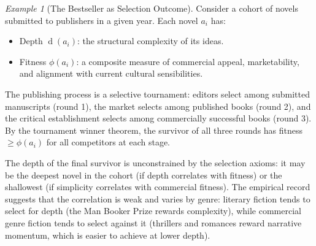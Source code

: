\documentclass[11pt,openany]{book}
\theoremstyle{definition}
\theoremstyle{plain}
\theoremstyle{remark}
\newtheorem{example}[axiom]{Example}
\newcommand{\depth}{\operatorname{d}}       %
\begin{document}
\begin{example}[The Bestseller as Selection Outcome]
Consider a cohort of novels submitted to publishers in a given year. Each novel $a_i$ has:
\begin{itemize}
\item Depth $\depth(a_i)$: the structural complexity of its ideas.
\item Fitness $\phi(a_i)$: a composite measure of commercial appeal, marketability, and alignment with current cultural sensibilities.
\end{itemize}

The publishing process is a selective tournament: editors select among submitted manuscripts (round 1), the market selects among published books (round 2), and the critical establishment selects among commercially successful books (round 3). By the tournament winner theorem, the survivor of all three rounds has fitness $\geq \phi(a_i)$ for all competitors at each stage.

The depth of the final survivor is unconstrained by the selection axioms: it may be the deepest novel in the cohort (if depth correlates with fitness) or the shallowest (if simplicity correlates with commercial fitness). The empirical record suggests that the correlation is weak and varies by genre: literary fiction tends to select for depth (the Man Booker Prize rewards complexity), while commercial genre fiction tends to select against it (thrillers and romances reward narrative momentum, which is easier to achieve at lower depth).
\end{example}
\end{document}
